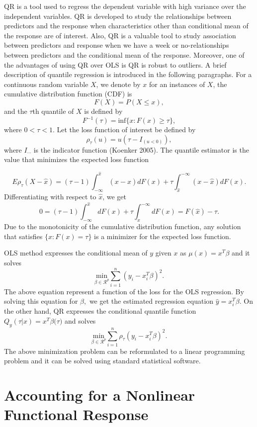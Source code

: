 \documentclass[
  12pt,
]{article}
\begin{document}
QR is a tool used to regress the dependent variable with high variance over the independent variables. QR is developed to study the relationships between predictors and the response when characteristics other than conditional mean of the response are of interest. Also, QR is a valuable tool to study association between predictors and response when we have a week or no-relationships between predictors and the conditional mean of the response. Moreover, one of the advantages of using QR over OLS is QR is robust to outliers.
A brief description of quantile regression is introduced in the following paragraphs.
For a continuous random variable \(X\), we denote by \(x\) for an instances of \(X\), the cumulative distribution function (CDF) is \[F(X)=P(X\leq x),\] and the \(\tau\)th quantile of \(X\) is defined by \[ F^{-1}(\tau)=\text{inf}\{x: F(x)\ge \tau\}, \] where \(0<\tau<1\).
Let the loss function of interest be defined by \[\rho_{\tau}(u)= u(\tau-I_{(u<0)}),\] where \(I_{\cdots}\) is the indicator function (Koenker 2005). The quantile estimator is the value that minimizes the expected loss function

\[E\rho_{\tau}(X-\hat{x})=(\tau-1)\int_{-\infty}^{\hat{x}} (x-\hat{x})dF(x)+\tau\int_{\hat{x}}^{-\infty} (x-\hat{x})dF(x).\]
Differentiating with respect to \(\hat{x}\), we get
\[ 0  =(\tau-1)\int_{-\infty}^{\hat{x}} dF(x)+\tau\int_{\hat{x}}^{-\infty} dF(x)
=F(\hat{x})-\tau.\]
Due to the monotonicity of the cumulative distribution function, any solution that satisfies \(\{x:F(x)=\tau \}\) is a minimizer for the expected loss function.

OLS method expresses the conditional mean of \(y\) given \(x\) as \(\mu(x)=x^T\beta\) and it solves \[ \underset{\beta\in \mathcal{R}^p}{\text{min}}\sum_{i=1}^n(y_i- x_i^T\beta)^2.\]
The above equation represent a function of the loss for the OLS regression. By solving this equation for \(\beta,\) we get the estimated regression equation \(\hat{y}=x_i^T\beta\).
On the other hand, QR expresses the conditional quantile function \(Q_y(\tau|x)=x^T \beta ({\tau)}\) and solves \[ \underset{\beta\in \mathcal{R}^p}{\text{min}}\sum_{i=1}^n\rho_{\tau}(y_i- x_i^T\beta)^2.\]
The above minimization problem can be reformulated to a linear programming problem and it can be solved using standard statistical software.

\section{Accounting for a Nonlinear Functional Response}
\end{document}
